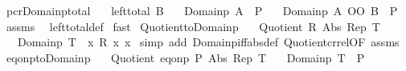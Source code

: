 \begin{isabellebody}
\isanewline
{}\isamarkupfalse%
\ pcr{\isacharunderscore}{\kern0pt}Domainp{\isacharunderscore}{\kern0pt}total{\isacharcolon}{\kern0pt}\isanewline
\ \ \ {\isachardoublequoteopen}left{\isacharunderscore}{\kern0pt}total\ B{\isachardoublequoteclose}\isanewline
\ \ \ {\isachardoublequoteopen}Domainp\ A\ {\isacharequal}{\kern0pt}\ P{\isachardoublequoteclose}\isanewline
\ \ \ {\isachardoublequoteopen}Domainp\ {\isacharparenleft}{\kern0pt}A\ OO\ B{\isacharparenright}{\kern0pt}\ {\isacharequal}{\kern0pt}\ P{\isachardoublequoteclose}\isanewline
%
\isadelimproof
%
\endisadelimproof
%
\isatagproof
{}\isamarkupfalse%
\ assms\ \isamarkupfalse%
\ left{\isacharunderscore}{\kern0pt}total{\isacharunderscore}{\kern0pt}def\isanewline
{}\isamarkupfalse%
\ fast%
\endisatagproof
{\isafoldproof}%
%
\isadelimproof
\isanewline
%
\endisadelimproof
\isanewline
{}\isamarkupfalse%
\ Quotient{\isacharunderscore}{\kern0pt}to{\isacharunderscore}{\kern0pt}Domainp{\isacharcolon}{\kern0pt}\isanewline
\ \ \ {\isachardoublequoteopen}Quotient\ R\ Abs\ Rep\ T{\isachardoublequoteclose}\isanewline
\ \ \ {\isachardoublequoteopen}Domainp\ T\ {\isacharequal}{\kern0pt}\ {\isacharparenleft}{\kern0pt}{\isasymlambda}x{\isachardot}{\kern0pt}\ R\ x\ x{\isacharparenright}{\kern0pt}{\isachardoublequoteclose}\isanewline
%
\isadelimproof
%
\endisadelimproof
%
\isatagproof
{}\isamarkupfalse%
\ {\isacharparenleft}{\kern0pt}simp\ add{\isacharcolon}{\kern0pt}\ Domainp{\isacharunderscore}{\kern0pt}iff{\isacharbrackleft}{\kern0pt}abs{\isacharunderscore}{\kern0pt}def{\isacharbrackright}{\kern0pt}\ Quotient{\isacharunderscore}{\kern0pt}cr{\isacharunderscore}{\kern0pt}rel{\isacharbrackleft}{\kern0pt}OF\ assms{\isacharbrackright}{\kern0pt}{\isacharparenright}{\kern0pt}%
\endisatagproof
{\isafoldproof}%
%
\isadelimproof
\isanewline
%
\endisadelimproof
\isanewline
{}\isamarkupfalse%
\ eq{\isacharunderscore}{\kern0pt}onp{\isacharunderscore}{\kern0pt}to{\isacharunderscore}{\kern0pt}Domainp{\isacharcolon}{\kern0pt}\isanewline
\ \ \ {\isachardoublequoteopen}Quotient\ {\isacharparenleft}{\kern0pt}eq{\isacharunderscore}{\kern0pt}onp\ P{\isacharparenright}{\kern0pt}\ Abs\ Rep\ T{\isachardoublequoteclose}\isanewline
\ \ \ {\isachardoublequoteopen}Domainp\ T\ {\isacharequal}{\kern0pt}\ P{\isachardoublequoteclose}\isanewline
%
\isadelimproof
%
\endisadelimproof
%
\isatagproof
{}\isamarkupfalse%

\end{isabellebody}
